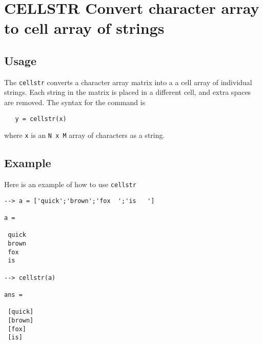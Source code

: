 \section{CELLSTR Convert character array to cell array of strings}

\subsection{Usage}

The \verb|cellstr| converts a character array matrix into a 
a cell array of individual strings.  Each string in
the matrix is placed in a different cell, and extra spaces
are removed.  The syntax for the command is
\begin{verbatim}
   y = cellstr(x)
\end{verbatim}
where \verb|x| is an \verb|N x M| array of characters as a string.
\subsection{Example}

Here is an example of how to use \verb|cellstr|
\begin{verbatim}
--> a = ['quick';'brown';'fox  ';'is   ']

a = 

 quick
 brown
 fox  
 is   

--> cellstr(a)

ans = 

 [quick] 
 [brown] 
 [fox] 
 [is] 
\end{verbatim}
